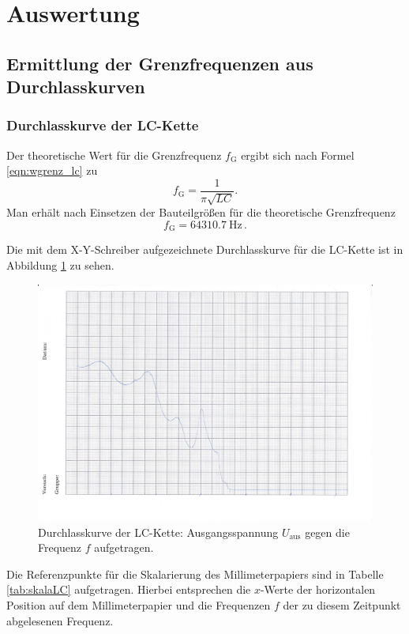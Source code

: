 \section{Auswertung}
\label{sec:Auswertung}




\subsection{Ermittlung der Grenzfrequenzen aus Durchlasskurven}

\subsubsection{Durchlasskurve der LC-Kette}
\label{sec:durchLC}
Der theoretische Wert für die Grenzfrequenz $f_{\text{G}}$ ergibt sich nach Formel \eqref{eqn:wgrenz_lc} zu
\begin{equation}
	f_{\text{G}} = \frac{1}{\pi \sqrt{LC}} \text{.}
\end{equation}
Man erhält nach Einsetzen der Bauteilgrößen für die theoretische Grenzfrequenz
\begin{equation*}
	f_{\text{G}} = \SI{64310.7}{\hertz} \, \text{.}
\end{equation*}

Die mit dem X-Y-Schreiber aufgezeichnete Durchlasskurve für die LC-Kette ist in Abbildung
\ref{fig:durchiLC} zu sehen.
\begin{figure}
	\centering
	\includegraphics[width=1.02\textwidth]{Bilder/durchlasskurve_lc_kette.jpg}
	\caption{Durchlasskurve der LC-Kette: Ausgangsspannung $U_{\text{aus}}$ gegen die
	Frequenz $f$ aufgetragen.}
	\label{fig:durchiLC}
\end{figure}
Die Referenzpunkte für die Skalarierung des Millimeterpapiers sind in Tabelle
\ref{tab:skalaLC} aufgetragen. Hierbei entsprechen die $x$-Werte der horizontalen Position
auf dem Millimeterpapier und die Frequenzen $f$ der zu diesem Zeitpunkt abgelesenen Frequenz.

